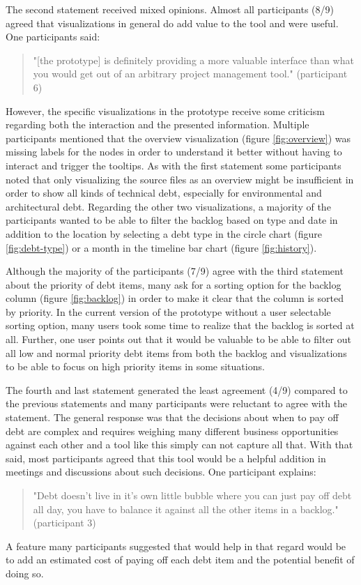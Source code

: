 The second statement received mixed opinions.
Almost all participants (8/9) agreed that visualizations in general do add value to the tool and were useful.
One participants said:
\begin{quote}
  "[the prototype] is definitely providing a more valuable interface than what you would get out of an arbitrary project management tool." (participant 6)
\end{quote}
However, the specific visualizations in the prototype receive some criticism regarding both the interaction and the presented information. 
Multiple participants mentioned that the overview visualization (figure \ref{fig:overview}) was missing labels for the nodes in order to understand it better without having to interact and trigger the tooltips.
As with the first statement some participants noted that only visualizing the source files as an overview might be insufficient in order to show all kinds of technical debt, especially for environmental and architectural debt.
Regarding the other two visualizations, a majority of the participants wanted to be able to filter the backlog based on type and date in addition to the location by selecting a debt type in the circle chart (figure \ref{fig:debt-type}) or a month in the timeline bar chart (figure \ref{fig:history}).

Although the majority of the participants (7/9) agree with the third statement about the priority of debt items, many ask for a sorting option for the backlog column (figure \ref{fig:backlog}) in order to make it clear that the column is sorted by priority.
In the current version of the prototype without a user selectable sorting option, many users took some time to realize that the backlog is sorted at all.
Further, one user points out that it would be valuable to be able to filter out all low and normal priority debt items from both the backlog and visualizations to be able to focus on high priority items in some situations.

The fourth and last statement generated the least agreement (4/9) compared to the previous statements and many participants were reluctant to agree with the statement.
The general response was that the decisions about when to pay off debt are complex and requires weighing many different business opportunities against each other and a tool like this simply can not capture all that.
With that said, most participants agreed that this tool would be a helpful addition in meetings and discussions about such decisions.
One participant explains:
\begin{quote}
  "Debt doesn't live in it's own little bubble where you can just pay off debt all day, you have to balance it against all the other items in a backlog." (participant 3)
\end{quote}
A feature many participants suggested that would help in that regard would be to add an estimated cost of paying off each debt item and the potential benefit of doing so.

